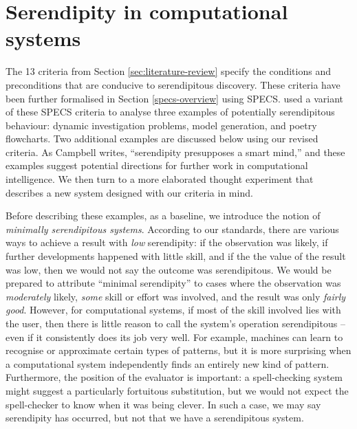\section{Serendipity in computational systems} \label{sec:computational-serendipity}

The 13 criteria from Section \ref{sec:literature-review} specify the
conditions and preconditions that are conducive to serendipitous
discovery.  These criteria have been further formalised
in Section \ref{specs-overview} using SPECS.
 used a variant of these SPECS criteria to
analyse three examples of potentially serendipitous behaviour: dynamic
investigation problems, model generation, and poetry flowcharts.  Two
additional examples are discussed below using our revised criteria.
As Campbell \citeyear{campbell2005serendipity} writes, ``serendipity
presupposes a smart mind,'' and these examples suggest potential
directions for further work in computational intelligence.  We then
turn to a more elaborated thought experiment that describes a new
system designed with our criteria in mind.

Before describing these examples, as a baseline, we introduce the
notion of \emph{minimally serendipitous systems}. According to our
standards, there are various ways to achieve a result with \emph{low}
serendipity: if the observation was likely, if further developments
happened with little skill, and if the the value of the result was
low, then we would not say the outcome was serendipitous.  We would be
prepared to attribute ``minimal serendipity'' to cases where the
observation was \emph{moderately} likely, \emph{some} skill or effort
was involved, and the result was only \emph{fairly good}.  However,
for computational systems, if most of the skill involved lies with the
user, then there is little reason to call the system's operation
serendipitous -- even if it consistently does its job very well.  For
example, machines can learn to recognise or approximate certain types
of patterns, but it is more surprising when a computational system
independently finds an entirely new kind of pattern.  Furthermore, the
position of the evaluator is important: a spell-checking system might
suggest a particularly fortuitous substitution, but we would not
expect the spell-checker to know when it was being clever.  In such a
case, we may say serendipity has occurred, but not that we have a
serendipitous system.

